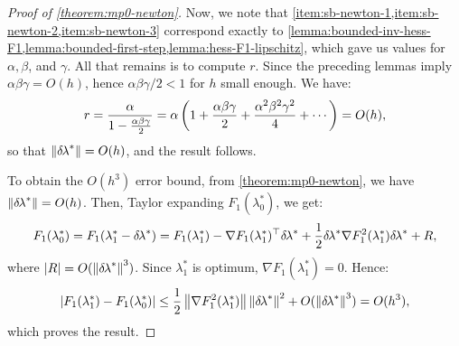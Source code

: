 \documentclass[eikonal.tex]{subfiles}
\begin{document}
\begin{proof}[Proof of \cref{theorem:mp0-newton}]
  Now, we note that
  \cref{item:sb-newton-1,item:sb-newton-2,item:sb-newton-3} correspond
  exactly to
  \cref{lemma:bounded-inv-hess-F1,lemma:bounded-first-step,lemma:hess-F1-lipschitz},
  which gave us values for $\alpha, \beta$, and $\gamma$. All that
  remains is to compute $r$. Since the preceding lemmas imply
  $\alpha\beta\gamma = O(h)$, hence $\alpha\beta\gamma/2 < 1$ for $h$
  small enough. We have:
  \begin{equation}
    r = \frac{\alpha}{1 - \frac{\alpha\beta\gamma}{2}} = \alpha \left(1 + \frac{\alpha\beta\gamma}{2} + \frac{\alpha^2\beta^2\gamma^2}{4} + \cdots\right) = O(h),
  \end{equation}
  so that $\left\|{\delta \hspace{-0.1em} \lambda}^*\right\| = O(h)$, and the result follows.

  To obtain the $O(h^3)$ error bound, from \cref{theorem:mp0-newton},
  we have $\left\|{\delta \hspace{-0.1em} \lambda}^*\right\| = O(h)$. Then, Taylor expanding
  $F_1(\lambda_0^*)$, we get:
  \begin{equation*}
    F_1(\lambda_0^*)
    = F_1(\lambda_1^* - {\delta \hspace{-0.1em} \lambda}^*) = F_1(\lambda_1^*) - \nabla F_1(\lambda_1^*)^\top {\delta \hspace{-0.1em} \lambda}^* + \frac{1}{2} {\delta \hspace{-0.1em} \lambda}^* \nabla F_1^2(\lambda_1^*) {\delta \hspace{-0.1em} \lambda}^* + R,
  \end{equation*}
  where $\left|R\right| = O(\left\|{\delta \hspace{-0.1em} \lambda}^*\right\|^3)$. Since $\lambda_1^*$
  is optimum, $\nabla F_1(\lambda_1^*) = 0$. Hence:
  \begin{equation*}
    \left|F_1(\lambda_1^*) - F_1(\lambda_0^*)\right| \leq \frac{1}{2} \left\|\nabla F_1^2(\lambda_1^*)\right\| \left\|{\delta \hspace{-0.1em} \lambda}^*\right\|^2 + O(\left\|{\delta \hspace{-0.1em} \lambda}^*\right\|^3) = O(h^3),
  \end{equation*}
  which proves the result.
\end{proof}
\end{document}
